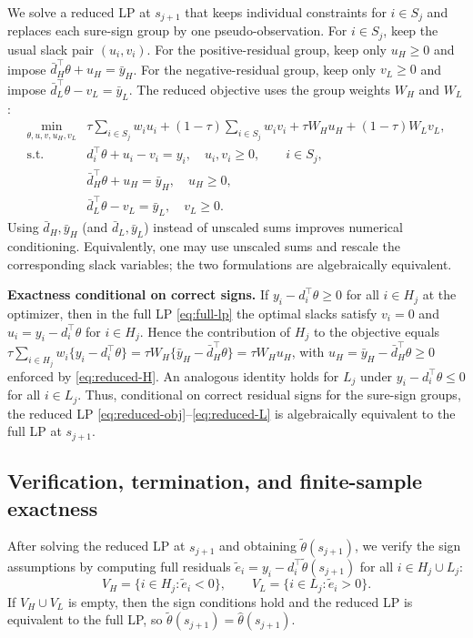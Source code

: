 \documentclass[lineno]{biometrika}
\begin{document}
We solve a reduced LP at $s_{j+1}$ that keeps individual constraints for $i\in S_j$ and replaces each sure-sign group by one
pseudo-observation. For $i\in S_j$, keep the usual slack pair $(u_i,v_i)$. For the positive-residual group, keep only $u_H\ge 0$
and impose $\bar d_H^\top\theta+u_H=\bar y_H$. For the negative-residual group, keep only $v_L\ge 0$ and impose
$\bar d_L^\top\theta-v_L=\bar y_L$. The reduced objective uses the group weights $W_H$ and $W_L$:
\begin{align}
\min_{\theta, u, v, u_H, v_L}  
& \tau\sum_{i\in S_j} w_i u_i + (1-\tau)\sum_{i\in S_j} w_i v_i
  + \tau W_H u_H + (1-\tau) W_L v_L, \label{eq:reduced-obj}\\
\text{s.t.}  
& d_i^\top\theta+u_i-v_i=y_i,\quad u_i,v_i\ge 0,\qquad i\in S_j, \label{eq:reduced-uncertain}\\
& \bar d_H^\top\theta+u_H=\bar y_H,\quad u_H\ge 0, \label{eq:reduced-H}\\
& \bar d_L^\top\theta-v_L=\bar y_L,\quad v_L\ge 0. \label{eq:reduced-L}
\end{align}
Using $\bar d_H,\bar y_H$ (and $\bar d_L,\bar y_L$) instead of unscaled sums improves numerical conditioning. Equivalently, one may
use unscaled sums and rescale the corresponding slack variables; the two formulations are algebraically equivalent.

\textbf{Exactness conditional on correct signs.}
If $y_i-d_i^\top\theta\ge 0$ for all $i\in H_j$ at the optimizer, then in the full LP \eqref{eq:full-lp} the optimal slacks satisfy
$v_i=0$ and $u_i=y_i-d_i^\top\theta$ for $i\in H_j$. Hence the contribution of $H_j$ to the objective equals
$\tau\sum_{i\in H_j} w_i\{y_i-d_i^\top\theta\}=\tau W_H\{\bar y_H-\bar d_H^\top\theta\}=\tau W_H u_H$,
with $u_H=\bar y_H-\bar d_H^\top\theta\ge 0$ enforced by \eqref{eq:reduced-H}. An analogous identity holds for $L_j$ under
$y_i-d_i^\top\theta\le 0$ for all $i\in L_j$. Thus, conditional on correct residual signs for the sure-sign groups, the reduced LP
\eqref{eq:reduced-obj}--\eqref{eq:reduced-L} is algebraically equivalent to the full LP at $s_{j+1}$.

\subsection{Verification, termination, and finite-sample exactness}

After solving the reduced LP at $s_{j+1}$ and obtaining $\tilde\theta(s_{j+1})$, we verify the sign assumptions by computing full
residuals $\tilde e_i=y_i-d_i^\top\tilde\theta(s_{j+1})$ for all $i\in H_j\cup L_j$:
\[
V_H=\{i\in H_j:\tilde e_i<0\},\qquad
V_L=\{i\in L_j:\tilde e_i>0\}.
\]
If $V_H\cup V_L$ is empty, then the sign conditions hold and the reduced LP is equivalent to the full LP, so
$\tilde\theta(s_{j+1})=\hat\theta(s_{j+1})$.
\end{document}
